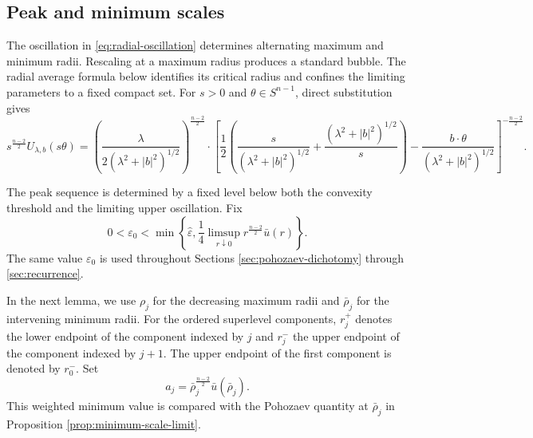 \documentclass[11pt]{article}
\numberwithin{equation}{section}
\theoremstyle{remark}
\newcommand{\Sph}{S}
\newcommand{\eps}{\varepsilon}
\begin{document}
\par
\subsection{Peak and minimum scales}

{
The oscillation in \eqref{eq:radial-oscillation} determines alternating
maximum and minimum radii. Rescaling at a maximum radius produces a standard
bubble. The radial average formula below identifies its critical radius and
confines the limiting parameters to a fixed compact set. For \(s>0\) and
\(\theta\in\Sph^{n-1}\), direct substitution gives
}
\begin{equation}\label{eq:bubble-radial-form}
 s^{\frac{n-2}{2}}U_{\lambda,b}(s\theta)
 =
 \left(
 \frac{\lambda}{2(\lambda^2+|b|^2)^{1/2}}
 \right)^{\frac{n-2}{2}} \cdot
 \left[
 \frac12\left(
 \frac{s}{(\lambda^2+|b|^2)^{1/2}}
 +\frac{(\lambda^2+|b|^2)^{1/2}}{s}
 \right)
 -\frac{b \cdot\theta }{(\lambda^2+|b|^2)^{1/2}}
 \right]^{-\frac{n-2}{2}}.
\end{equation}

The peak sequence is determined by a fixed level below both the convexity
threshold and the limiting upper oscillation. Fix
\begin{equation}\label{eq:epsilon-zero-choice}
 0<\eps_0<
 \min\left\{
 \widehat\eps,
 \frac14\limsup_{r\downarrow0}r^{\frac{n-2}{2}}\bar u(r)
 \right\}.
\end{equation}
The same value \(\eps_0\) is used throughout
Sections  \ref{sec:pohozaev-dichotomy}  through \ref{sec:recurrence}.

{In the next lemma, we use \(\rho_j\) for the decreasing
maximum radii and \(\bar\rho_j\) for the intervening minimum radii.}
For the ordered superlevel components, \(r_j^+\) denotes the lower endpoint
of the component indexed by \(j\) and \(r_j^-\) the upper endpoint of the
component indexed by \(j+1\). The upper endpoint of the first component is denoted by
\(r_0^-\). Set
\begin{equation}\label{eq:minimum-depth-definition}
 a_j=\bar\rho_j^{\frac{n-2}{2}}\bar u(\bar\rho_j).
\end{equation}
This weighted minimum value is compared with the Pohozaev quantity at
\(\bar\rho_j\) in Proposition  \ref{prop:minimum-scale-limit}.
\end{document}
